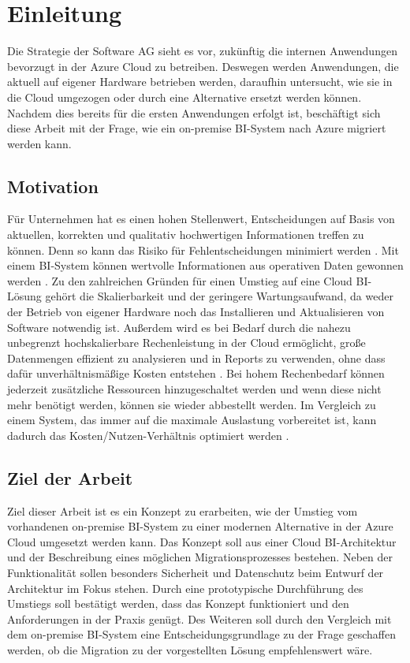 \chapter{Einleitung} \label{ch:intro}
Die Strategie der Software AG sieht es vor, zukünftig die internen Anwendungen bevorzugt in der Azure Cloud zu betreiben. Deswegen werden Anwendungen, die aktuell auf eigener Hardware betrieben werden, daraufhin untersucht, wie sie in die Cloud umgezogen oder durch eine Alternative ersetzt werden können. Nachdem dies bereits für die ersten Anwendungen erfolgt ist, beschäftigt sich diese Arbeit mit der Frage, wie ein on-premise BI-System nach Azure migriert werden kann.

\section{Motivation} \label{sec:intro:motivation}
Für Unternehmen hat es einen hohen Stellenwert, Entscheidungen auf Basis von aktuellen, korrekten und qualitativ hochwertigen Informationen treffen zu können. Denn so kann das Risiko für Fehlentscheidungen minimiert werden \cite{grunwald_business_2009}. Mit einem BI-System können wertvolle Informationen aus operativen Daten gewonnen werden \cite{muller_business_2013}. Zu den zahlreichen Gründen für einen Umstieg auf eine Cloud BI-Lösung gehört die Skalierbarkeit und der geringere Wartungsaufwand, da weder der Betrieb von eigener Hardware noch das Installieren und Aktualisieren von Software notwendig ist. Außerdem wird es bei Bedarf durch die nahezu unbegrenzt hochskalierbare Rechenleistung in der Cloud ermöglicht, große Datenmengen effizient zu analysieren und in Reports zu verwenden, ohne dass dafür unverhältnismäßige Kosten entstehen \cite{gurjar_cloud_2013}. Bei hohem Rechenbedarf können jederzeit zusätzliche Ressourcen hinzugeschaltet werden und wenn diese nicht mehr benötigt werden, können sie wieder abbestellt werden. Im Vergleich zu einem System, das immer auf die maximale Auslastung vorbereitet ist, kann dadurch das Kosten/Nutzen-Verhältnis optimiert werden \cite{ouf_cloud_2011}.

\section{Ziel der Arbeit} \label{sec:intro:ziele}
Ziel dieser Arbeit ist es ein Konzept zu erarbeiten, wie der Umstieg vom vorhandenen on-premise BI-System zu einer modernen Alternative in der Azure Cloud umgesetzt werden kann. Das Konzept soll aus einer Cloud BI-Architektur und der Beschreibung eines möglichen Migrationsprozesses bestehen. Neben der Funktionalität sollen besonders Sicherheit und Datenschutz beim Entwurf der Architektur im Fokus stehen. Durch eine prototypische Durchführung des Umstiegs soll bestätigt werden, dass das Konzept funktioniert und den Anforderungen in der Praxis genügt. Des Weiteren soll durch den Vergleich mit dem on-premise BI-System eine Entscheidungsgrundlage zu der Frage geschaffen werden, ob die Migration zu der vorgestellten Lösung empfehlenswert wäre.

